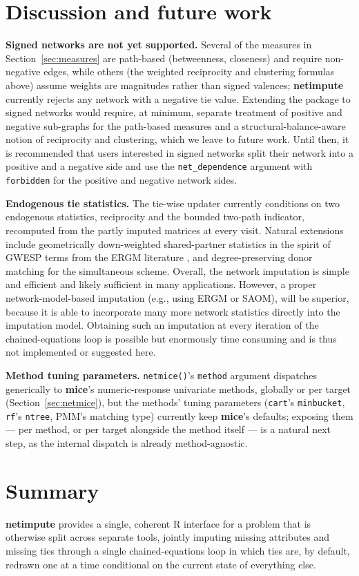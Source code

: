 \documentclass[11pt,a4paper]{article}
\newcommand{\pkg}[1]{\textbf{#1}}
\newcommand{\code}[1]{\texttt{#1}}
\newcommand{\proglang}[1]{\textsf{#1}}
\begin{document}
\section{Discussion and future work}
\label{sec:discussion}

\textbf{Signed networks are not yet supported.} Several of the measures in
Section~\ref{sec:measures} are path-based (betweenness, closeness) and
require non-negative edges, while others (the weighted reciprocity and
clustering formulas above) assume weights are magnitudes rather than
signed valences; \pkg{netimpute} currently rejects any network with a
negative tie value. Extending the package to signed networks would
require, at minimum, separate treatment of positive and negative sub-graphs
for the path-based measures and a structural-balance-aware notion of
reciprocity and clustering, which we leave to future work. Until then, it is
recommended that users interested in signed networks split their network into a
positive and a negative side and use the \code{net\_dependence} argument  with
\code{forbidden} for the positive and negative network sides.

\textbf{Endogenous tie statistics.} The tie-wise updater currently
conditions on two endogenous statistics, reciprocity and the bounded
two-path indicator, recomputed from the partly imputed matrices at every
visit. Natural extensions include geometrically down-weighted shared-partner statistics in the spirit
of GWESP terms from the ERGM literature \citep{Robins2007}, and
degree-preserving donor matching for the simultaneous scheme. Overall, the
network imputation is simple and efficient and likely sufficient in many
applications. However, a proper network-model-based imputation (e.g., using ERGM
or SAOM), will be superior, because it is able to incorporate many more network
statistics directly into the imputation model. Obtaining such an imputation at
every iteration of the chained-equations loop is possible but enormously time
consuming and is thus not implemented or suggested here.

\textbf{Method tuning parameters.} \code{netmice()}'s \code{method}
argument dispatches generically to \pkg{mice}'s numeric-response
univariate methods, globally or per target
(Section~\ref{sec:netmice}), but the methods' tuning parameters
(\code{cart}'s \code{minbucket}, \code{rf}'s \code{ntree}, PMM's matching
type) currently keep \pkg{mice}'s defaults; exposing them --- per method,
or per target alongside the method itself --- is a natural next step, as
the internal dispatch is already method-agnostic.

\section{Summary}
\label{sec:summary}

\pkg{netimpute} provides a single, coherent \proglang{R} interface for a
problem that is otherwise split across separate tools, jointly imputing missing
attributes and missing ties through a single chained-equations loop in
which ties are, by default, redrawn one at a time conditional on the
current state of everything else.



\end{document}
